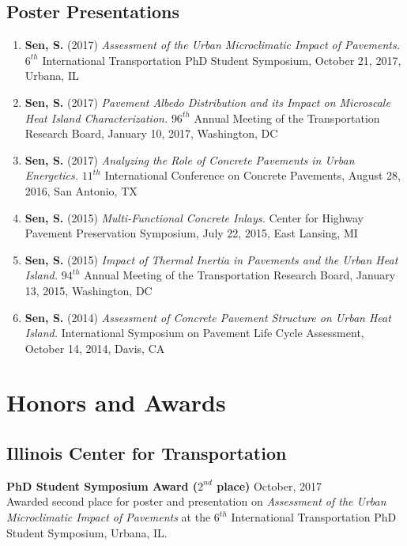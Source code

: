 \documentclass[12pt]{article}
\begin{document}
\subsection*{Poster Presentations}
\begin{enumerate}[label=(\arabic*)]
	\item \textbf{Sen, S.} (2017) \textit{Assessment of the Urban Microclimatic Impact of Pavements.} $6^{th}$ International Transportation PhD Student Symposium, October 21, 2017, Urbana, IL
	\item \textbf{Sen, S.} (2017) \textit{Pavement Albedo Distribution and its Impact on Microscale Heat Island Characterization.} $96^{th}$ Annual Meeting of the Transportation Research Board, January 10, 2017, Washington, DC
	\item \textbf{Sen, S.} (2017) \textit{Analyzing the Role of Concrete Pavements in Urban Energetics.} $11^{th}$ International Conference on Concrete Pavements, August 28, 2016, San Antonio, TX
	\item \textbf{Sen, S.} (2015) \textit{Multi-Functional Concrete Inlays.} Center for Highway Pavement Preservation Symposium, July 22, 2015, East Lansing, MI
	\item \textbf{Sen, S.} (2015) \textit{Impact of Thermal Inertia in Pavements and the Urban Heat Island.} $94^{th}$ Annual Meeting of the Transportation Research Board, January 13, 2015, Washington, DC
	\item \textbf{Sen, S.} (2014) \textit{Assessment of Concrete Pavement Structure on Urban Heat Island.} International Symposium on Pavement Life Cycle Assessment, October 14, 2014, Davis, CA
\end{enumerate}

\section*{Honors and Awards}
\subsection*{Illinois Center for Transportation}
\textbf{PhD Student Symposium Award ($2^{nd}$ place)} \hfill October, 2017 \\
Awarded second place for poster and presentation on \textit{Assessment of the Urban Microclimatic Impact of Pavements} at the $6^{th}$ International Transportation PhD Student Symposium, Urbana, IL. \\
\end{document}
